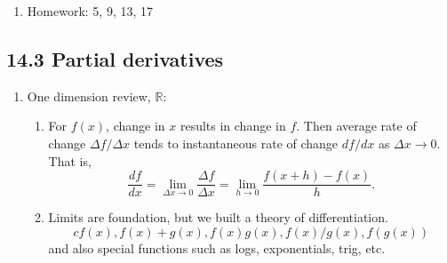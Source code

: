 \documentclass{article}
\begin{document}
\begin{enumerate}
\item Homework: 5, 9, 13, 17

\end{enumerate}

\subsection{14.3 Partial derivatives}
\begin{enumerate}
\item One dimension review, $\mathbb{R}$:
\begin{enumerate}
\item For $f(x)$, change in $x$ results in change in $f$. Then average rate of change $\Delta f/\Delta x$ tends to instantaneous rate of change $df/dx$ as $\Delta x \rightarrow 0$. That is,
\[
\frac{df}{dx} = \lim_{\Delta x \rightarrow 0} \frac{\Delta f}{\Delta x} = \lim_{h \rightarrow 0} \frac{f(x+h)-f(x)}{h}.
\]
\item Limits are foundation, but we built a theory of differentiation.
\[
cf(x), f(x)+g(x), f(x)g(x), f(x)/g(x), f(g(x))
\]
and also special functions such as logs, exponentials, trig, etc.
\end{enumerate}


\end{enumerate}
\end{document}
